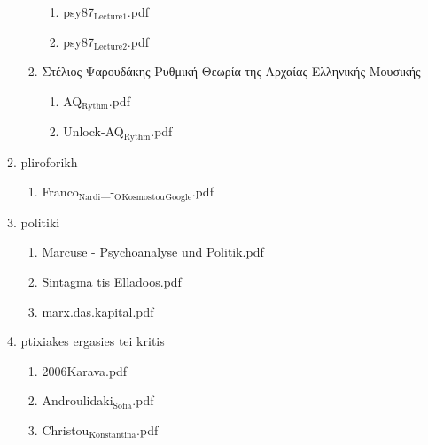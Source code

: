 \documentclass[11pt]{article}
\begin{document}
\begin{enumerate}
\begin{enumerate}
\begin{enumerate}
\begin{enumerate}
\item psy87$_{\text{Lecture1}}$.pdf
\label{sec-1-1-1-1-49-2-2-1-74-6-11}

\item psy87$_{\text{Lecture2}}$.pdf
\label{sec-1-1-1-1-49-2-2-1-74-6-12}
\end{enumerate}

\item Στέλιος Ψαρουδάκης Ρυθμική Θεωρία της Αρχαίας Ελληνικής Μουσικής
\label{sec-1-1-1-1-49-2-2-1-74-7}
\begin{enumerate}
\item AQ$_{\text{Rythm}}$.pdf
\label{sec-1-1-1-1-49-2-2-1-74-7-1}

\item Unlock-AQ$_{\text{Rythm}}$.pdf
\label{sec-1-1-1-1-49-2-2-1-74-7-2}
\end{enumerate}
\end{enumerate}

\item pliroforikh
\label{sec-1-1-1-1-49-2-2-1-75}
\begin{enumerate}
\item Franco$_{\text{Nardi}}$\_-$_{\text{O}}$$_{\text{Kosmos}}$$_{\text{tou}}$$_{\text{Google}}$.pdf
\label{sec-1-1-1-1-49-2-2-1-75-1}
\end{enumerate}

\item politiki
\label{sec-1-1-1-1-49-2-2-1-76}
\begin{enumerate}
\item Marcuse - Psychoanalyse und Politik.pdf
\label{sec-1-1-1-1-49-2-2-1-76-1}

\item Sintagma tis Elladoos.pdf
\label{sec-1-1-1-1-49-2-2-1-76-2}

\item marx.das.kapital.pdf
\label{sec-1-1-1-1-49-2-2-1-76-3}
\end{enumerate}

\item ptixiakes ergasies tei kritis
\label{sec-1-1-1-1-49-2-2-1-77}
\begin{enumerate}
\item 2006Karava.pdf
\label{sec-1-1-1-1-49-2-2-1-77-1}

\item Androulidaki$_{\text{Sofia}}$.pdf
\label{sec-1-1-1-1-49-2-2-1-77-2}

\item Christou$_{\text{Konstantina}}$.pdf
\label{sec-1-1-1-1-49-2-2-1-77-3}


\end{enumerate}
\end{enumerate}
\end{enumerate}
\end{document}
